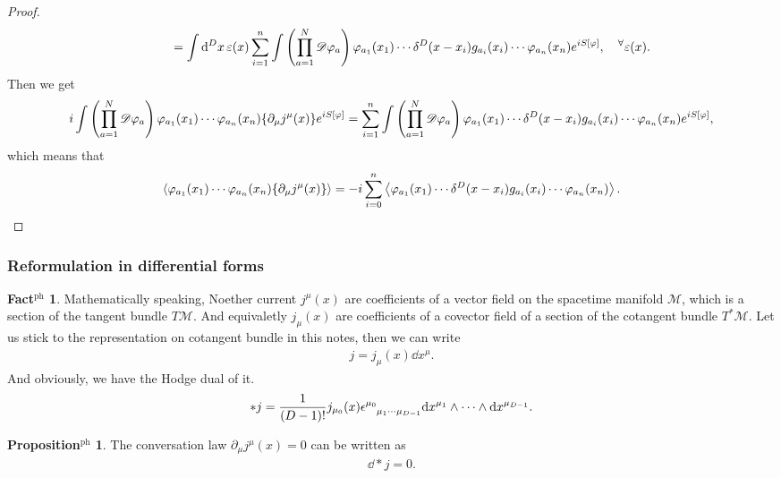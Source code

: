 \documentclass{article}
\theoremstyle{definition}
\newtheorem{propositionph}{Proposition$^\mathrm{ph}$}[section]
\newtheorem{factph}{Fact$^\mathrm{ph}$}[section]
\numberwithin{equation}{section}
\newcommand{\fidim}{\int \qty(\prod_{a = 1}^{N} \mathscr{D}\varphi_a) \, }
\newcommand{\intst}{\int \dd^Dx \,}
\newcommand{\del}{\partial_\mu}
\begin{document}
\begin{proof}
\begin{align}
    & \quad\quad\quad\quad = \intst \varepsilon(x) \sum_{i = 1}^{n} \fidim \varphi_{a_1}(x_1) \cdots \delta^D(x - x_i) g_{a_i}(x_i) \cdots \varphi_{a_n}(x_n)e^{iS[\varphi]},
      \quad ^\forall \varepsilon(x).
  \end{align}
  Then we get
  \begin{align}
    i\fidim \varphi_{a_1}(x_1) \cdots \varphi_{a_n}(x_n) \qty{\del j^\mu(x)}e^{iS[\varphi]}
    = \sum_{i = 1}^{n} \fidim \varphi_{a_1}(x_1) \cdots \delta^D(x - x_i) g_{a_i}(x_i) \cdots \varphi_{a_n}(x_n)e^{iS[\varphi]},
  \end{align}
  which means that
  \begin{align}
    \ev{\varphi_{a_1}(x_1) \cdots \varphi_{a_n}(x_n) \qty{\del j^\mu(x)}} = -i\sum_{i = 0}^{n}\ev{\varphi_{a_1}(x_1) \cdots \delta^D(x - x_i) g_{a_i}(x_i) \cdots \varphi_{a_n}(x_n)}.
    \label{corr-conv-law}
  \end{align}
\end{proof}

\subsubsection{Reformulation in differential forms}
\begin{factph}
  Mathematically speaking, Noether current $j^\mu(x)$ are coefficients of a vector field on the spacetime manifold $\mathscr{M}$, which is a section of the tangent bundle $T\mathscr{M}$. And equivaletly $j_\mu(x)$ are coefficients of a covector field of a section of the cotangent bundle $T^*\mathscr{M}$. Let us stick to the representation on cotangent bundle in this notes, then we can write
  \begin{align}
    j = j_\mu(x) \dd x^\mu.
  \end{align}
  And obviously, we have the Hodge dual of it.
  \begin{align}
    *j = \frac{1}{(D - 1)!}j_{\mu_0}(x) \tensor{\epsilon}{^{\mu_0}_{\mu_1\cdots\mu_{D-1}}} \dd x^{\mu_1} \wedge \cdots \wedge \dd x^{\mu_{D-1}}.
  \end{align}
\end{factph}

\begin{propositionph}
  The conversation law $\del j^\mu(x) = 0$ can be written as
  \begin{align}
    \dd *j = 0.
  \end{align}
\end{propositionph}
\end{document}

